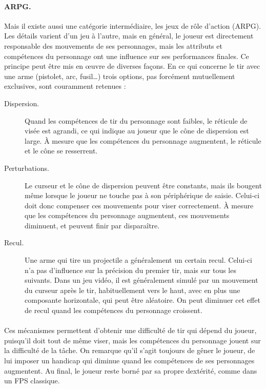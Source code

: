 	\paragraph{ARPG.}
	Mais il existe aussi une catégorie intermédiaire, les jeux de rôle d'action (ARPG). Les détails varient d'un jeu à l'autre, mais en général, le joueur est directement responsable des mouvements de ses personnages, mais les attributs et compétences du personnage ont une influence sur ses performances finales. Ce principe peut être mis en œuvre de diverses façons. En ce qui concerne le tir avec une arme (pistolet, arc, fusil\ldots{}) trois options, pas forcément mutuellement exclusives, sont couramment retenues :
	\begin{description}
		\item[Dispersion.] Quand les compétences de tir du personnage sont faibles, le réticule de visée est agrandi, ce qui indique au joueur que le cône de dispersion est large. À mesure que les compétences du personnage augmentent, le réticule et le cône se resserrent.
		\item[Perturbations.] Le curseur et le cône de dispersion peuvent être constants, mais ils bougent même lorsque le joueur ne touche pas à son périphérique de saisie. Celui-ci doit donc compenser ces mouvements pour viser correctement. À mesure que les compétences du personnage augmentent, ces mouvements diminuent, et peuvent finir par disparaître.
		\item[Recul.] Une arme qui tire un projectile a généralement un certain recul. Celui-ci n'a pas d'influence sur la précision du premier tir, mais sur tous les suivants. Dans un jeu vidéo, il est généralement simulé par un mouvement du curseur après le tir, habituellement vers le haut, avec en plus une composante horizontale, qui peut être aléatoire. On peut diminuer cet effet de recul quand les compétences du personnage croissent.
	\end{description}

	\paragraph*{}
	Ces mécanismes permettent d'obtenir une difficulté de tir qui dépend du joueur, puisqu'il doit tout de même viser, mais les compétences du personnage jouent sur la difficulté de la tâche. On remarque qu'il s'agit toujours de gêner le joueur, de lui imposer un handicap qui diminue quand les compétences de ses personnages augmentent. Au final, le joueur reste borné par sa propre dextérité, comme dans un FPS classique.
	

